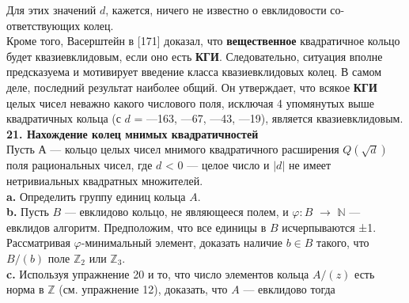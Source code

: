 \documentclass{mai_book}
\begin{document}
\noindent Для этих значений $d$, кажется, ничего не известно о евклидовости со-\linebreak ответствующих колец.\\
\hspace*{10pt}Кроме того, Васерштейн в [171] доказал, что \textbf{вещественное} квадратичное кольцо будет квазиевклидовым, если оно есть \textbf{КГИ}. Следовательно, ситуация вполне предсказуема и мотивирует введение класса\linebreak
квазиевклидовых колец. В самом деле, последний результат наиболее\linebreak
общий. Он утверждает, что всякое \textbf{КГИ} целых чисел неважно какого\linebreak
числового поля, исключая 4 упомянутых выше квадратичных кольца\linebreak
(с $d$ = —163, —67, —43, —19), является квазиевклидовым.
\\
 \newline
\noindent\textbf{21. Нахождение колец мнимых квадратичностей}\\
 \newline
\hspace*{10pt}Пусть А — кольцо целых чисел мнимого квадратичного расширения\linebreak
$Q(\sqrt{d})$ поля рациональных чисел, где $d$ < 0 — целое число и $|d|$ не имеет\linebreak
нетривиальных квадратных множителей.\\
 \newline
 \hspace*{10pt}\textbf{a.} Определить группу единиц кольца $A$.\\
 \newline
  \hspace*{10pt}\textbf{b.} Пусть $B$ — евклидово кольцо, не являющееся полем, и\linebreak
$\varphi : B$ $\rightarrow$ $\mathbb {N}$ — евклидов алгоритм. Предположим, что все единицы в\linebreak
$B$ исчерпываются ±1. Рассматривая $\varphi$-минимальный элемент, доказать\linebreak
наличие $b \in B$ такого, что $B/(b)$ поле $\mathbb{Z}_2$ или $\mathbb {Z}_3$.
\\
 \newline
  \hspace*{10pt}\textbf{c.} Используя упражнение 20 и то, что число элементов кольца  $A/(z)$\linebreak
есть норма в $\mathbb {Z}$ (см. упражнение 12), доказать, что $A$ — евклидово тогда\linebreak
\end{document}
